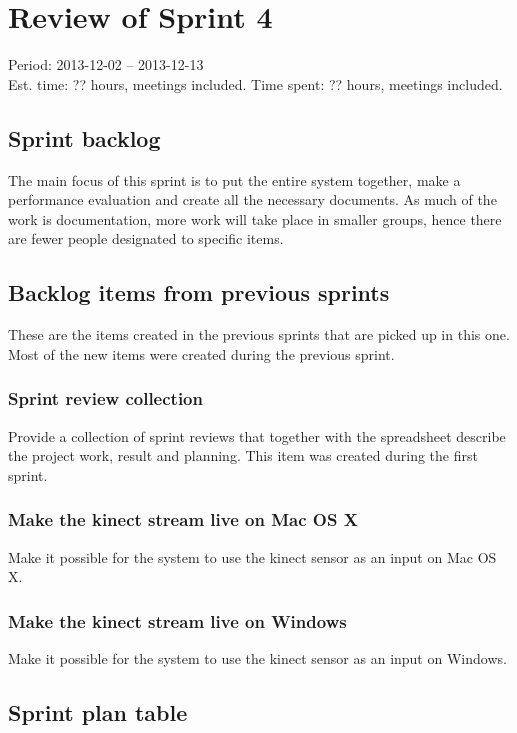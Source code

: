 \section{Review of Sprint 4}
\label{sec:sprint4}
\large Period: 2013-12-02 -- 2013-12-13 \\ 
\large Est. time: ?? hours, meetings included.
\large Time spent: ?? hours, meetings included.

\subsection{Sprint backlog}
The main focus of this sprint is to put the entire system together, make a performance evaluation and create all the necessary documents. As much of the work is documentation, more work will take place in smaller groups, hence there are fewer people designated to specific items.

\subsection{Backlog items from previous sprints}
These are the items created in the previous sprints that are picked up in this one. Most of the new items were created during the previous sprint.

\subsubsection{Sprint review collection}
Provide a collection of sprint reviews that together with the spreadsheet describe the project work, result and planning. This item was created during the first sprint.

\subsubsection{Make the kinect stream live on Mac OS X}
Make it possible for the system to use the kinect sensor as an input on Mac OS X.

\subsubsection{Make the kinect stream live on Windows}
Make it possible for the system to use the kinect sensor as an input on Windows.



\newpage

\subsection{Sprint plan table}

